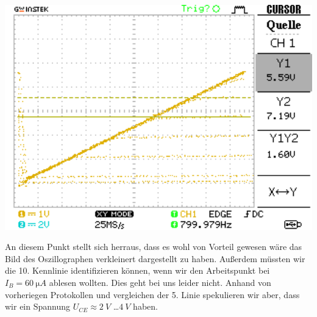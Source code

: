 \documentclass[10pt]{article}
\newenvironment{Figure}
  {\par\medskip\noindent\minipage{\linewidth}}
  {\endminipage\par\medskip}
\begin{document}
\begin{multicols}{2}
	\begin{Figure}
		\centering\includegraphics[width=1\textwidth]{../data/Kennlinie4_npn.png}
		\label{fig:1.6}
	\end{Figure}
	An diesem Punkt stellt sich herraus, dass es wohl von Vorteil gewesen wäre das Bild des Oszillographen verkleinert dargestellt zu haben. Außerdem müssten wir die 10. Kennlinie identifizieren können, wenn wir den Arbeitspunkt bei $I_B = \SI{60}{\micro A}$ ablesen wollten. Dies geht bei uns leider nicht. Anhand von vorheriegen Protokollen und vergleichen der 5. Linie spekulieren wir aber, dass wir ein Spannung $U_{CE} \approx \SI{2}{V}$ \dots $\SI{4}{V}$ haben.


\end{multicols}
\end{document}
